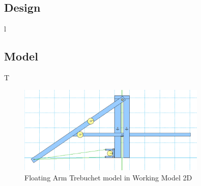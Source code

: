 \documentclass[12pt, titlepage]{article}
\begin{document}
    \subsection{Design}
    l
    \newpage
    \subsection{Model}
    T

    \begin{figure}[t]                                  
    \centering
    \includegraphics[width=0.8\textwidth]{Model.png}
    \caption{Floating Arm Trebuchet model in Working Model 2D\label{model}}
    \end{figure}
\end{document}
